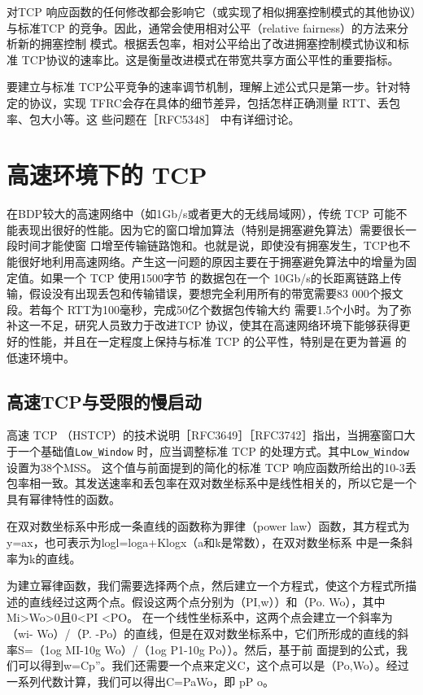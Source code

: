 对TCP 响应函数的任何修改都会影响它（或实现了相似拥塞控制模式的其他协议）与标准TCP 的竞争。因此，通常会使用相对公平（relative fairness）的方法来分析新的拥塞控制
模式。根据丢包率，相对公平给出了改进拥塞控制模式协议和标准 TCP协议的速率比。这是衡量改进模式在带宽共享方面公平性的重要指标。

要建立与标准 TCP公平竞争的速率调节机制，理解上述公式只是第一步。针对特定的协议，实现 TFRC会存在具体的细节差异，包括怎样正确测量 RTT、丢包率、包大小等。这
些问题在［RFC5348］ 中有详细讨论。

\section{高速环境下的 TCP}

在BDP较大的高速网络中（如1Gb/s或者更大的无线局域网），传统 TCP 可能不能表现出很好的性能。因为它的窗口增加算法（特别是拥塞避免算法）需要很长一段时间才能使窗
口增至传输链路饱和。也就是说，即使没有拥塞发生，TCP也不能很好地利用高速网络。产生这一问题的原因主要在于拥塞避免算法中的增量为固定值。如果一个 TCP 使用1500字节
的数据包在一个 10Gb/s的长距离链路上传输，假设没有出现丢包和传输错误，要想完全利用所有的带宽需要83 000个报文段。若每个 RTT为100毫秒，完成50亿个数据包传输大约
需要1.5个小时。为了弥补这一不足，研究人员致力于改进TCP 协议，使其在高速网络环境下能够获得更好的性能，并且在一定程度上保持与标准 TCP 的公平性，特别是在更为普遍
的低速环境中。

\subsection{高速TCP与受限的慢启动}
高速 TCP （HSTCP）的技术说明［RFC3649］［RFC3742］指出，当拥塞窗口大于一个基础值\verb|Low_Window| 时，应当调整标准 TCP 的处理方式。其中\verb|Low_Window| 设置为38个MSS。
这个值与前面提到的简化的标准 TCP 响应函数所给出的10-3丢包率相一致。其发送速率和丢包率在双对数坐标系中是线性相关的，所以它是一个具有幂律特性的函数。

\begin{tcolorbox}
    在双对数坐标系中形成一条直线的函数称为罪律（power law）函数，其方程式为y=ax，也可表示为logl=loga+Klogx（a和k是常数），在双对数坐标系
    中是一条斜率为k的直线。
\end{tcolorbox}

为建立幂律函数，我们需要选择两个点，然后建立一个方程式，使这个方程式所描述的直线经过这两个点。假设这两个点分别为（PI,w））和（Po. Wo），其中Mi>Wo>0且0<PI <PO。
在一个线性坐标系中，这两个点会建立一个斜率为（wi- Wo）/（P. -Po）的直线，但是在双对数坐标系中，它们所形成的直线的斜率S=（1og MI-10g Wo）/（1og P1-10g Po））。然后，基于前
面提到的公式，我们可以得到w=Cp”。我们还需要一个点来定义C，这个点可以是（Po,Wo）。经过一系列代数计算，我们可以得出C=PaWo，即 pP o。

